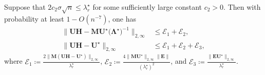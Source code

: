\begin{lemma}
\label{lem:UH-MUstar-diff-decompose}
%
Suppose that $2c_2\sigma\sqrt{n}\leq \lambda_r^{\star}$ for some sufficiently large constant $c_2>0$. Then with probability at least $1-O(n^{-7})$, one has
%
\begin{subequations}
	\label{eq:UH-MUstar-Ustar-diff-2inf-general}
	\begin{align}
		\big\|\bm{U}\bm{H}-\bm{M}\bm{U}^{\star}\big(\bm{\Lambda}^{\star}\big)^{-1}\big\|_{2,\infty} & \leq\mathcal{E}_{1}+\mathcal{E}_{2},
		\label{eq:UH-MUstarLambdastar-diff-2inf-general}\\
		\big\|\bm{U}\bm{H}-\bm{U}^{\star}\big\|_{2,\infty} & \leq \mathcal{E}_{1}+\mathcal{E}_{2}+ \mathcal{E}_3,
		\label{eq:UH-Ustar-diff-2inf-general}
	\end{align}
\end{subequations}
%
where
%
%
$\mathcal{E}_{1}\coloneqq\frac{2\|\bm{M}(\bm{U}\bm{H}-\bm{U}^{\star})\|_{2,\infty}}{\lambda_{r}^{\star}}$, $\mathcal{E}_{2}\coloneqq\frac{4\|\bm{M}\bm{U}^{\star}\|_{2,\infty}\|\bm{E}\|}{(\lambda_{r}^{\star})^{2}}$, and $\mathcal{E}_{3}\coloneqq\frac{\|\bm{E}\bm{U}^{\star}\|_{2,\infty}}{\lambda_{r}^{\star}}$.
%
%
\end{lemma}
%




